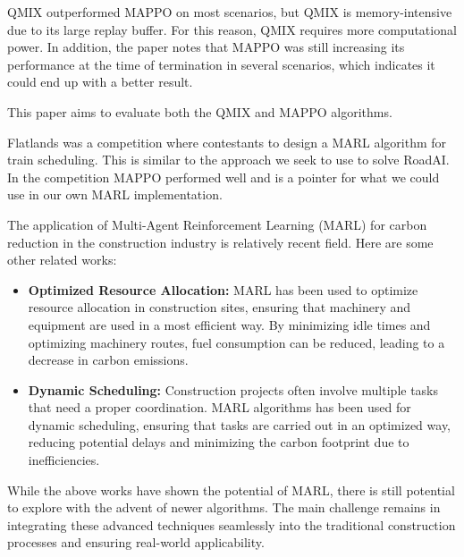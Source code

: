 \documentclass[conference]{IEEEtran}
\begin{document}
	QMIX outperformed MAPPO on most scenarios, but QMIX is memory-intensive due to its large replay buffer. For
	this reason, QMIX requires more computational power. In addition, the paper notes that MAPPO was still
	increasing its performance at the time of termination in several scenarios, which indicates it could end up
	with a better result.

	This paper aims to evaluate both the QMIX and MAPPO algorithms.


	Flatlands\cite{laurent2021flatland} was a competition where contestants to design a MARL algorithm for
	train scheduling. This is similar to the approach we seek to use to solve RoadAI.
	In the competition MAPPO performed well and is a pointer for what we could use in our own MARL implementation.


	The application of Multi-Agent Reinforcement Learning (MARL) for carbon reduction in the construction industry is relatively recent field. Here are some other related works:

	\begin{itemize}

		\item \textbf{Optimized Resource Allocation:}
			MARL has been used to optimize resource allocation in construction sites, ensuring that machinery and equipment are used in a most efficient way. By minimizing idle times and optimizing machinery routes, fuel consumption can be reduced, leading to a decrease in carbon emissions\cite{resource_allocation}.

		\item \textbf{Dynamic Scheduling:}
			Construction projects often involve multiple tasks that need a proper coordination. MARL algorithms has been used for dynamic scheduling, ensuring that tasks are carried out in an optimized way, reducing potential delays and minimizing the carbon footprint due to inefficiencies\cite{dynamic_scheduling}.

	\end{itemize}

	While the above works have shown the potential of MARL, there is still potential to explore with the advent of newer algorithms. The main challenge remains in integrating these advanced techniques seamlessly into the traditional construction processes and ensuring real-world applicability.

	\noindent


\end{document}
